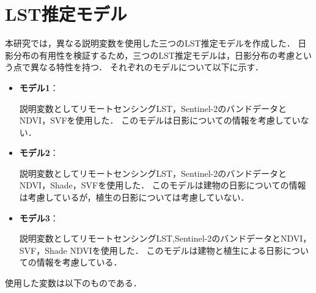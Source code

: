\documentclass[12pt,epsf]{jreport}
\begin{document}
\section{LST推定モデル}
本研究では，異なる説明変数を使用した三つのLST推定モデルを作成した．
日影分布の有用性を検証するため，三つのLST推定モデルは，日影分布の考慮という点で異なる特性を持つ．
それぞれのモデルについて以下に示す．

\begin{itemize}
    \item \textbf{モデル1}：

    説明変数としてリモートセンシングLST，Sentinel-2のバンドデータとNDVI，SVFを使用した．
    このモデルは日影についての情報を考慮していない．

    \item \textbf{モデル2}：

    説明変数としてリモートセンシングLST，Sentinel-2のバンドデータとNDVI，Shade，SVFを使用した．
    このモデルは建物の日影についての情報は考慮しているが，植生の日影については考慮していない．


    \item \textbf{モデル3}：

    説明変数としてリモートセンシングLST,Sentinel-2のバンドデータとNDVI，SVF，Shade NDVIを使用した．
    このモデルは建物と植生による日影についての情報を考慮している．
    
\end{itemize}

使用した変数は以下のものである．
\end{document}
